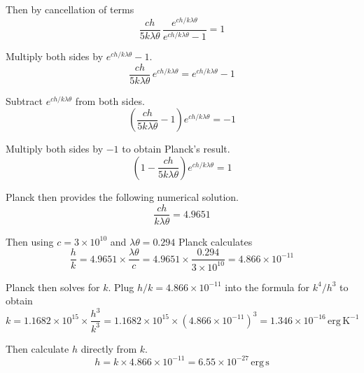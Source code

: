 \documentclass[12pt]{article}
\begin{document}
Then by cancellation of terms
\begin{equation*}
\frac{ch}{5k\lambda\theta}\,\frac{e^{ch/k\lambda\theta}}{e^{ch/k\lambda\theta}-1}=1
\end{equation*}

Multiply both sides by $e^{ch/k\lambda\theta}-1$.
\begin{equation*}
\frac{ch}{5k\lambda\theta}\, e^{ch/k\lambda\theta}
=e^{ch/k\lambda\theta}-1
\end{equation*}

Subtract $e^{ch/k\lambda\theta}$ from both sides.
\begin{equation*}
\left(\frac{ch}{5k\lambda\theta}-1\right)e^{ch/k\lambda\theta}=-1
\end{equation*}

Multiply both sides by $-1$ to obtain Planck's result.
\begin{equation*}
\left(1-\frac{ch}{5k\lambda\theta}\right)e^{ch/k\lambda\theta}=1
\end{equation*}

Planck then provides the following numerical solution.
\begin{equation*}
\frac{ch}{k\lambda\theta}=4.9651
\end{equation*}

Then using $c=3\times10^{10}$ and $\lambda\theta=0.294$ Planck calculates
\begin{equation*}
\frac{h}{k}=4.9651\times\frac{\lambda\theta}{c}=4.9651\times\frac{0.294}{3\times10^{10}}=4.866\times10^{-11}
\end{equation*}

Planck then solves for $k$.
Plug $h/k=4.866\times10^{-11}$ into the formula for $k^4/h^3$ to obtain
\begin{equation*}
k=1.1682\times10^{15}\times\frac{h^3}{k^3}
=1.1682\times10^{15}\times(4.866\times10^{-11})^3=1.346\times10^{-16}\,\text{erg}\,\text{K}^{-1}
\end{equation*}

Then calculate $h$ directly from $k$.
\begin{equation*}
h=k\times4.866\times10^{-11}=6.55\times10^{-27}\,\text{erg}\,\text{s}
\end{equation*}
\end{document}
